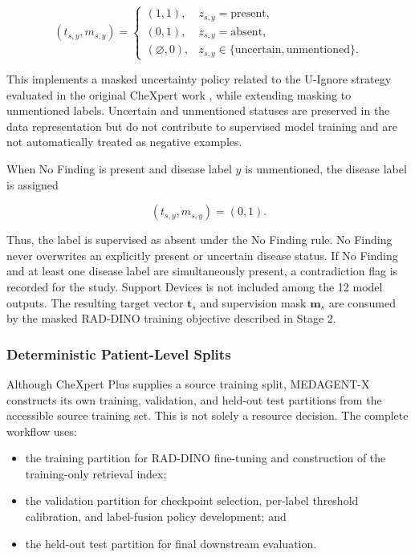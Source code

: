 \[
(t_{s,y},m_{s,y})=
\begin{cases}
(1,1), & z_{s,y}=\mathrm{present},\\
(0,1), & z_{s,y}=\mathrm{absent},\\
(\varnothing,0), & z_{s,y}\in\{\mathrm{uncertain},\mathrm{unmentioned}\}.
\end{cases}
\]

This implements a masked uncertainty policy related to the U-Ignore strategy evaluated in the original CheXpert work \cite{irvin2019chexpert}, while extending masking to unmentioned labels. Uncertain and unmentioned statuses are preserved in the data representation but do not contribute to supervised model training and are not automatically treated as negative examples.

When No Finding is present and disease label $y$ is unmentioned, the disease label is assigned

\[
(t_{s,y},m_{s,y})=(0,1).
\]

Thus, the label is supervised as absent under the No Finding rule. No Finding never overwrites an explicitly present or uncertain disease status. If No Finding and at least one disease label are simultaneously present, a contradiction flag is recorded for the study. Support Devices is not included among the 12 model outputs. The resulting target vector $\mathbf{t}_s$ and supervision mask $\mathbf{m}_s$ are consumed by the masked RAD-DINO training objective described in Stage 2.

\subsubsection{Deterministic Patient-Level Splits}

Although CheXpert Plus supplies a source training split, MEDAGENT-X constructs its own training, validation, and held-out test partitions from the accessible source training set. This is not solely a resource decision. The complete workflow uses:

\begin{itemize}
    \item the training partition for RAD-DINO fine-tuning and construction of the training-only retrieval index;
    \item the validation partition for checkpoint selection, per-label threshold calibration, and label-fusion policy development; and
    \item the held-out test partition for final downstream evaluation.
\end{itemize}

